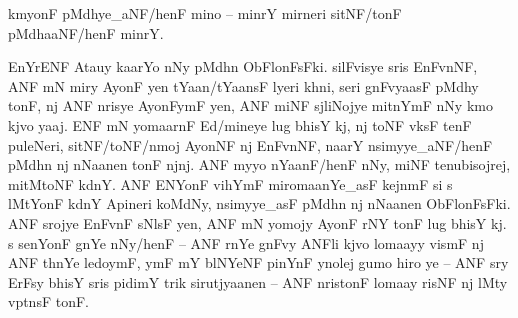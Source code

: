 \documentclass[12pt,varwidth=15.835cm,convert={density=96},border=1]{standalone}
\newenvironment{ayeri}{
    \doublespacing
    \Tagati
}{
    \par
}
\begin{document}

\begin{ayeri}
kmyonF pMdhye\_aNF/henF mino – minrY mirneri sitNF/tonF pMdhaaNF/henF minrY.

\hspace{0.25em} EnYrENF Atauy kaarYo nNy pMdhn ObFlonFsFki.
silF\-visye sris EnFvnNF, ANF mN miry AyonF yen tYaan/tYaansF lyeri khni, seri 
    gnFvyaasF pMdhy tonF, nj ANF nrisye AyonF\-ymF yen, ANF miNF sjliNojye 
    mitnYmF nNy kmo kjvo yaaj. ENF mN yomaarnF Ed/mineye lug bhisY kj, nj toNF 
    vksF tenF puleNeri, sitNF/toNF/nmoj AyonNF nj EnFvnNF, naarY 
    nsimyye\_aNF/henF pMdhn nj nNaanen tonF njnj. 
ANF myyo nYaanF/henF nNy, miNF tenubisojrej, mitMtoNF kdnY.
ANF ENYonF vihYmF miromaanYe\_asF kejnmF si s lMtYonF kdnY Apineri koMdNy, 
    nsimyye\_asF pMdhn nj nNaanen ObFlonFsFki.
ANF srojye EnFvnF sNlsF yen, ANF mN yomojy AyonF rNY tonF lug bhisY kj.
s senYonF gnYe nNy/henF – ANF rnYe gnF\-vy ANFli kjvo lomaayy vismF nj ANF 
    thnYe ledoymF, ymF mY blNYeNF pinYnF ynolej gumo hiro ye – ANF sry ErFsy
    bhisY sris pidimY trik sirutjyaanen – ANF nristonF lomaay risNF nj lMty
    vptnsF tonF.
\end{ayeri}

\end{document}
